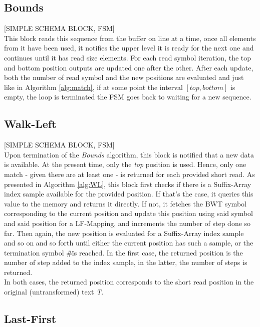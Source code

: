 \subsection{Bounds}

[SIMPLE SCHEMA BLOCK, FSM] \\


 This block reads this sequence from the buffer on line at a time, once all elements from it have been used, it notifies the upper level it is ready for the next one and continues until it has read \textrm{size} elements. For each read symbol iteration, the top and bottom position outputs are updated one after the other. After each update, both the number of read symbol and the new positions are evaluated and just like in Algorithm \ref{alg:match}, if at some point the interval $ [ top,bottom ] $ is empty, the loop is terminated the FSM goes back to waiting for a new sequence.

\subsection{Walk-Left}

[SIMPLE SCHEMA BLOCK, FSM] \\

Upon termination of the \textsl{Bounds} algorithm, this block is notified that a new data is available. At the present time, only the \textsl{top} position is used. Hence, only one match - given there are at least one - is returned for each provided short read. As presented in Algorithm \ref{alg:WL}, this block first checks if there is a Suffix-Array index sample available for the provided position. If that's the case, it queries this value to the memory and returns it directly. If not, it fetches the BWT symbol corresponding to the current position and update this position using said symbol and said position for a LF-Mapping, and increments the number of step done so far. Then again, the new position is evaluated for a Suffix-Array index sample and so on and so forth until either the current position has such a sample, or the termination symbol \"\#\" is reached.
In the first case, the returned position is the number of step added to the index sample, in the latter, the number of steps is returned. \\

In both cases, the returned position corresponds to the short read position in the original (untransformed) text \textsl{T}.

\subsection{Last-First}

